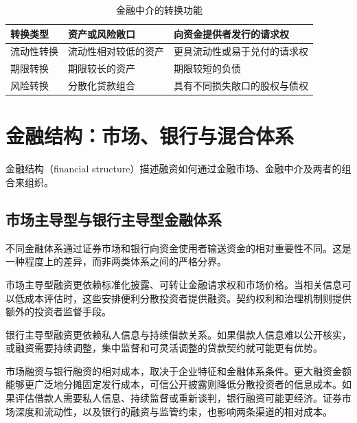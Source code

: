 \begin{table}[htbp]
\centering
\caption{金融中介的转换功能}
\label{tab:ch4-transformation}

\renewcommand{\arraystretch}{1.15}

\begin{tabularx}{\textwidth}{
@{}
>{\raggedright\arraybackslash}p{3.2cm}
>{\raggedright\arraybackslash}X
>{\raggedright\arraybackslash}X
@{}
}

\toprule
\textbf{转换类型}
& \textbf{资产或风险敞口}
& \textbf{向资金提供者发行的请求权} \\
\midrule

流动性转换
& 流动性相对较低的资产
& 更具流动性或易于兑付的请求权 \\

期限转换
& 期限较长的资产
& 期限较短的负债 \\

风险转换
& 分散化贷款组合
& 具有不同损失敞口的股权与债权 \\

\bottomrule
\end{tabularx}

\end{table}



\section{金融结构：市场、银行与混合体系}

金融结构（financial structure）描述融资如何通过金融市场、金融中介及两者的组合来组织。

\subsection{市场主导型与银行主导型金融体系}

不同金融体系通过证券市场和银行向资金使用者输送资金的相对重要性不同。这是一种程度上的差异，而非两类体系之间的严格分界。

市场主导型融资更依赖标准化披露、可转让金融请求权和市场价格。当相关信息可以低成本评估时，这些安排便利分散投资者提供融资。契约权利和治理机制则提供额外的投资者监督手段。

银行主导型融资更依赖私人信息与持续借款关系。如果借款人信息难以公开核实，或融资需要持续调整，集中监督和可灵活调整的贷款契约就可能更有优势。

市场融资与银行融资的相对成本，取决于企业特征和金融体系条件。更大融资金额能够更广泛地分摊固定发行成本，可信公开披露则降低分散投资者的信息成本。如果评估借款人需要私人信息、持续监督或重新谈判，银行融资可能更经济。证券市场深度和流动性，以及银行的融资与监管约束，也影响两条渠道的相对成本。

